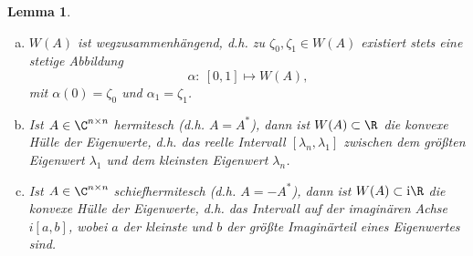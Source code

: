 \documentclass[
]{mycourse}
\theoremstyle{mythm}
\newtheorem{lemma}[theorem]{Lemma}
\theoremstyle{break}
\renewcommand{\im}{\ensuremath{\mathrm{i}}} 			      	%
\begin{document}
\begin{lemma}\label{lemma:eigW}
\begin{enumerate}[(a)]
\item $W(A)$ ist \emph{wegzusammenhängend},
d.h. zu $\zeta_0, \zeta_1\in W(A)$ existiert stets eine stetige Abbildung
\[
\alpha:\ [0,1]\mapsto W(A),
\]
mit $\alpha(0)=\zeta_0$ und $\alpha_1=\zeta_1$.
\item Ist $A\in \C^{n\times n}$ \emph{hermitesch} (d.h. $A=A^*$), dann ist $W(A)\subset \R$ die konvexe Hülle der
Eigenwerte, d.h. das reelle Intervall $[\lambda_n,\lambda_1]$ zwischen dem größten Eigenwert $\lambda_1$ und dem kleinsten Eigenwert $\lambda_n$. 
\item Ist $A\in \C^{n\times n}$ \emph{schiefhermitesch} (d.h. $A=-A^*$), dann ist $W(A) \subset \im \R$ die konvexe Hülle der
Eigenwerte, d.h. das Intervall auf der imaginären Achse $i[a,b]$, wobei $a$ der kleinste und $b$ der größte Imaginärteil eines Eigenwertes sind.
\end{enumerate}
\end{lemma}
\end{document}
